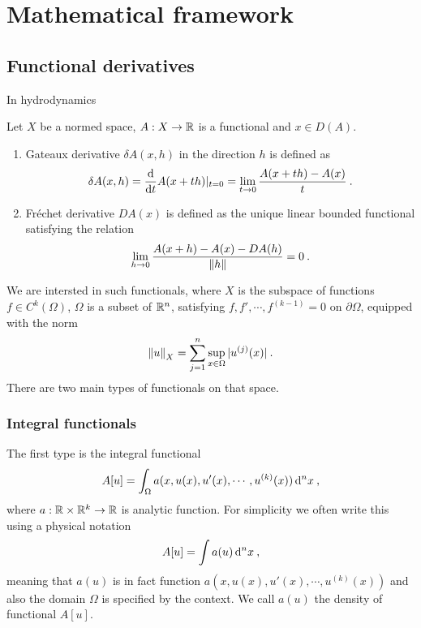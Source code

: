 \chapter{Mathematical framework}



\section{Functional derivatives}

In hydrodynamics 

\begin{definition}
    Let $X$ be a normed space, $A: X \to \mathbb{R}$ is a functional and $x \in D(A)$.
    \begin{enumerate}
        \item Gateaux derivative $\delta A(x,h)$ in the direction $h$ is defined as
        \begin{align}
            \delta A (x,h) = \frac{\mathrm{d}}{\mathrm{d}t} A(x+th) |_{t=0} = \lim_{t \rightarrow 0} \frac{A(x+th)-A(x)}{t} \:.
        \end{align}

        \item Fréchet derivative $DA(x)$ is defined as the unique linear bounded functional satisfying the relation
        \begin{align}
            \lim_{h \rightarrow 0} \frac{A(x+h)-A(x)- DA(h)}{\left \Vert h \right \Vert} = 0 \:.
        \end{align}
    \end{enumerate}
\end{definition}

We are intersted in such functionals, where $X$ is the subspace of functions $ f \in C^k(\Omega)$, $\Omega$ is a subset of $\mathbb{R}^n$, satisfying $f,f',\cdots,f^{(k-1)} = 0$ on $\partial \Omega$, equipped with the norm
\begin{align}
    \left \Vert u \right \Vert_X = \sum_{j=1}^n \sup_{x \in \Omega} |u^{(j)}(x)| \:.
\end{align}
There are two main types of functionals on that space. 

\subsection{Integral functionals}

The first type is the integral functional
\begin{align}
    A[u] = \int_\Omega a(x,u(x),u'(x),\cdots,u^{(k)}(x)) \, \mathrm{d}^n x \:, \label{eq:integral-functional}
\end{align}
where $a : \mathbb{R} \times \mathbb{R}^{k} \to \mathbb{R}$ is analytic function.
For simplicity we often write this using a physical notation
\begin{align}
    A[u] = \int a(u) \, \mathrm{d}^n x \:,
\end{align}
meaning that $a(u)$ is in fact function $a(x,u(x),u'(x),\cdots, u^{(k)}(x))$ and also the domain $\Omega$ is specified by the context. We call $a(u)$ the density of functional $A[u]$.


